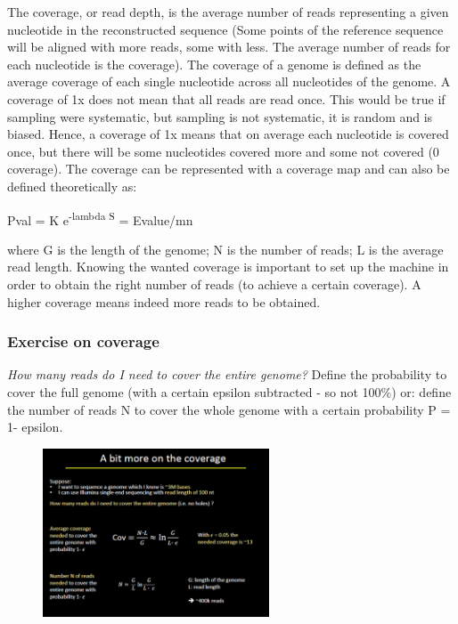 The coverage, or read depth, is the average number of reads representing a given nucleotide in the reconstructed sequence (Some points of the reference sequence will be aligned with more reads, some with less. The average number of reads for each nucleotide is the coverage). 
The coverage of a genome is defined as the average coverage of each single nucleotide across all nucleotides of the genome. 
A coverage of 1x does not mean that all reads are read once. This would be true if sampling were systematic, but sampling is not systematic, it is random and is biased. Hence, a coverage of 1x means that on average each nucleotide is covered once, but there will be some nucleotides covered more and some not covered (0 coverage). 
The coverage can be represented with a coverage map and can also be defined theoretically as:

\begin{center}
    Pval = K e\textsuperscript{-lambda S} = Evalue/mn
\end{center}

where G is the length of the genome; N is the  number of reads; L is the average read length.
Knowing the wanted coverage is important to set up the machine in order to obtain the right number of reads (to achieve a certain coverage). A higher coverage means indeed more reads to be obtained. 

\subsubsection{Exercise on coverage}

\emph{How many reads do I need to cover the entire genome?}
Define the probability  to cover the full genome (with a certain epsilon subtracted - so not 100$\%$) or: define the number of reads N to cover the whole genome with a certain probability P = 1- epsilon.

\begin{figure}[h]
\centering
\includegraphics[width=0.6\textwidth]{coverage.png}
\caption{}
\end{figure}

